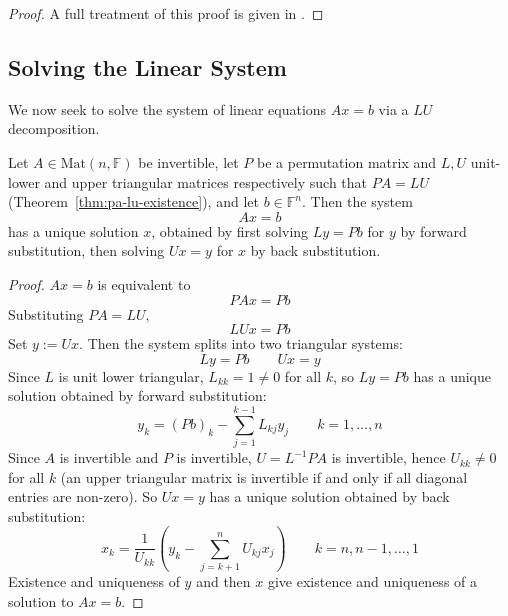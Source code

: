 		\begin{proof}
			A full treatment of this proof is given in \cite[\S3.4]{GolubVanLoan2013}.
		\end{proof}
		
	\subsection{Solving the Linear System}
		We now seek to solve the system of linear equations $Ax=b$ via a $LU$ decomposition.
		
		\begin{proposition}[Solving $Ax=b$ via $PA=LU$]
			\label{prop:solve-pa-lu}
			Let $A \in \mathrm{Mat}(n,\mathbb{F})$ be invertible, let $P$ be a permutation matrix and $L,U$ unit-lower and upper triangular matrices respectively such that $PA = LU$ (Theorem~\ref{thm:pa-lu-existence}), and let $b \in \mathbb{F}^n$. Then the system
			\[
				Ax = b
			\]
			has a unique solution $x$, obtained by first solving $Ly = Pb$ for $y$ by forward substitution, then solving $Ux = y$ for $x$ by back substitution.
		\end{proposition}
		
		\begin{proof}
			$Ax=b$ is equivalent to
			\[
				PAx = Pb
			\]
			Substituting $PA = LU$,
			\[
				LUx = Pb
			\]
			Set $y := Ux$. Then the system splits into two triangular systems:
			\[
				Ly = Pb \qquad Ux = y
			\]
			Since $L$ is unit lower triangular, $L_{kk}=1\neq 0$ for all $k$, so $Ly=Pb$ has a unique solution obtained by forward substitution:
			\[
				y_k = (Pb)_k - \sum_{j=1}^{k-1} L_{kj} y_j \qquad k = 1,\dots,n
			\]
			Since $A$ is invertible and $P$ is invertible, $U = L^{-1}PA$ is invertible, hence $U_{kk} \neq 0$ for all $k$ (an upper triangular matrix is invertible if and only if all diagonal entries are non-zero). So $Ux=y$ has a unique solution obtained by back substitution:
			\[
				x_k = \frac{1}{U_{kk}}\left(y_k - \sum_{j=k+1}^{n} U_{kj}x_j\right) \qquad k = n,n-1,\dots,1
			\]
			Existence and uniqueness of $y$ and then $x$ give existence and uniqueness of a solution to $Ax=b$.
		\end{proof}
		
